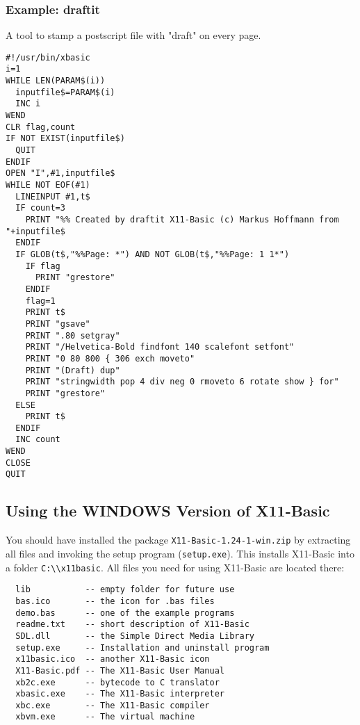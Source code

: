 \begin{mdframed}[hidealllines=true,backgroundcolor=blue!20]
\subsubsection*{Example: draftit} A tool to stamp a postscript file
with "draft" on every page.
{\footnotesize
\begin{verbatim}
#!/usr/bin/xbasic
i=1
WHILE LEN(PARAM$(i))
  inputfile$=PARAM$(i)
  INC i
WEND
CLR flag,count
IF NOT EXIST(inputfile$)
  QUIT
ENDIF  
OPEN "I",#1,inputfile$
WHILE NOT EOF(#1)
  LINEINPUT #1,t$
  IF count=3
    PRINT "%% Created by draftit X11-Basic (c) Markus Hoffmann from "+inputfile$
  ENDIF
  IF GLOB(t$,"%%Page: *") AND NOT GLOB(t$,"%%Page: 1 1*")
    IF flag
      PRINT "grestore"
    ENDIF
    flag=1
    PRINT t$
    PRINT "gsave"
    PRINT ".80 setgray"
    PRINT "/Helvetica-Bold findfont 140 scalefont setfont"
    PRINT "0 80 800 { 306 exch moveto"
    PRINT "(Draft) dup"
    PRINT "stringwidth pop 4 div neg 0 rmoveto 6 rotate show } for"
    PRINT "grestore"
  ELSE 
    PRINT t$
  ENDIF
  INC count
WEND
CLOSE
QUIT
\end{verbatim}
}
\end{mdframed}

\subsection{Using the WINDOWS Version of X11-Basic}

You should have installed the package \verb|X11-Basic-1.24-1-win.zip| by 
extracting all files and invoking the  setup program (\verb|setup.exe|). This
installs X11-Basic into a folder  \verb|C:\\x11basic|.  All files you need for
using X11-Basic are located there:

\begin{verbatim}
  lib           -- empty folder for future use
  bas.ico       -- the icon for .bas files
  demo.bas      -- one of the example programs
  readme.txt    -- short description of X11-Basic
  SDL.dll       -- the Simple Direct Media Library
  setup.exe     -- Installation and uninstall program
  x11basic.ico  -- another X11-Basic icon
  X11-Basic.pdf -- The X11-Basic User Manual
  xb2c.exe      -- bytecode to C translator
  xbasic.exe    -- The X11-Basic interpreter
  xbc.exe       -- The X11-Basic compiler
  xbvm.exe      -- The virtual machine
\end{verbatim}

